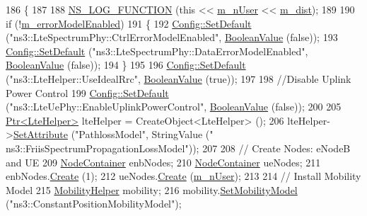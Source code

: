 \begin{DoxyCode}
186 \{
187 
188   \hyperlink{log-macros-disabled_8h_a90b90d5bad1f39cb1b64923ea94c0761}{NS\_LOG\_FUNCTION} (\textcolor{keyword}{this} << \hyperlink{classLenaTtaFfMacSchedulerTestCase_a62553f6f986f9e498a77482da9e649c5}{m\_nUser} << \hyperlink{classLenaTtaFfMacSchedulerTestCase_a1017fe2567e0c80556ff9bbaa76176c5}{m\_dist});
189 
190   \textcolor{keywordflow}{if} (!\hyperlink{classLenaTtaFfMacSchedulerTestCase_a74d353210829b60935ec66f0777d53b1}{m\_errorModelEnabled})
191     \{
192       \hyperlink{group__config_ga2e7882df849d8ba4aaad31c934c40c06}{Config::SetDefault} (\textcolor{stringliteral}{"ns3::LteSpectrumPhy::CtrlErrorModelEnabled"}, 
      \hyperlink{classns3_1_1BooleanValue}{BooleanValue} (\textcolor{keyword}{false}));
193       \hyperlink{group__config_ga2e7882df849d8ba4aaad31c934c40c06}{Config::SetDefault} (\textcolor{stringliteral}{"ns3::LteSpectrumPhy::DataErrorModelEnabled"}, 
      \hyperlink{classns3_1_1BooleanValue}{BooleanValue} (\textcolor{keyword}{false}));
194     \}
195 
196   \hyperlink{group__config_ga2e7882df849d8ba4aaad31c934c40c06}{Config::SetDefault} (\textcolor{stringliteral}{"ns3::LteHelper::UseIdealRrc"}, 
      \hyperlink{classns3_1_1BooleanValue}{BooleanValue} (\textcolor{keyword}{true}));
197 
198   \textcolor{comment}{//Disable Uplink Power Control}
199   \hyperlink{group__config_ga2e7882df849d8ba4aaad31c934c40c06}{Config::SetDefault} (\textcolor{stringliteral}{"ns3::LteUePhy::EnableUplinkPowerControl"}, 
      \hyperlink{classns3_1_1BooleanValue}{BooleanValue} (\textcolor{keyword}{false}));
200 
205   \hyperlink{classns3_1_1Ptr}{Ptr<LteHelper>} lteHelper = CreateObject<LteHelper> ();
206   lteHelper->\hyperlink{classns3_1_1ObjectBase_ac60245d3ea4123bbc9b1d391f1f6592f}{SetAttribute} (\textcolor{stringliteral}{"PathlossModel"}, StringValue (\textcolor{stringliteral}{"
      ns3::FriisSpectrumPropagationLossModel"}));
207 
208   \textcolor{comment}{// Create Nodes: eNodeB and UE}
209   \hyperlink{classns3_1_1NodeContainer}{NodeContainer} enbNodes;
210   \hyperlink{classns3_1_1NodeContainer}{NodeContainer} ueNodes;
211   enbNodes.\hyperlink{classns3_1_1NodeContainer_a787f059e2813e8b951cc6914d11dfe69}{Create} (1);
212   ueNodes.\hyperlink{classns3_1_1NodeContainer_a787f059e2813e8b951cc6914d11dfe69}{Create} (\hyperlink{classLenaTtaFfMacSchedulerTestCase_a62553f6f986f9e498a77482da9e649c5}{m\_nUser});
213 
214   \textcolor{comment}{// Install Mobility Model}
215   \hyperlink{classns3_1_1MobilityHelper}{MobilityHelper} mobility;
216   mobility.\hyperlink{classns3_1_1MobilityHelper_a030275011b6f40682e70534d30280aba}{SetMobilityModel} (\textcolor{stringliteral}{"ns3::ConstantPositionMobilityModel"});

\end{DoxyCode}
